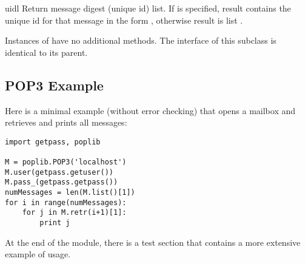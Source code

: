 \begin{methoddesc}[POP3]{uidl}{}
Return message digest (unique id) list.
If  is specified, result contains the unique id for that
message in the form ,
otherwise result is list .
\end{methoddesc}

Instances of  have no additional methods. The
interface of this subclass is identical to its parent.


\subsection{POP3 Example \label{pop3-example}}

Here is a minimal example (without error checking) that opens a
mailbox and retrieves and prints all messages:

\begin{verbatim}
import getpass, poplib

M = poplib.POP3('localhost')
M.user(getpass.getuser())
M.pass_(getpass.getpass())
numMessages = len(M.list()[1])
for i in range(numMessages):
    for j in M.retr(i+1)[1]:
        print j
\end{verbatim}

At the end of the module, there is a test section that contains a more
extensive example of usage.
